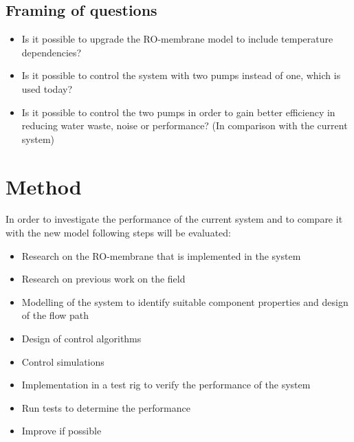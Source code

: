 \subsection{Framing of questions}
\begin{itemize}
\renewcommand\labelitemi{-}
   \item Is it possible to upgrade the RO-membrane model to include temperature dependencies?
   \item Is it possible to control the system with two pumps instead of one, which is used today?
    \item Is it possible to control the two pumps in order to gain better efficiency in reducing water waste, noise or performance? (In comparison with the current system)   
\end{itemize}


\section{Method}

In order to investigate the performance of the current system and to compare it with the new model following steps will be evaluated:

\begin{itemize}
\renewcommand\labelitemi{-}
    \item Research on the RO-membrane that is implemented in the system  
    \item Research on previous work on the field
    \item Modelling of the system to identify suitable component properties and design of the flow path
    \item Design of control algorithms
    \item Control simulations
    \item Implementation in a test rig to verify the performance of the system
    \item Run tests to determine the performance
    \item Improve if possible
\end{itemize}




